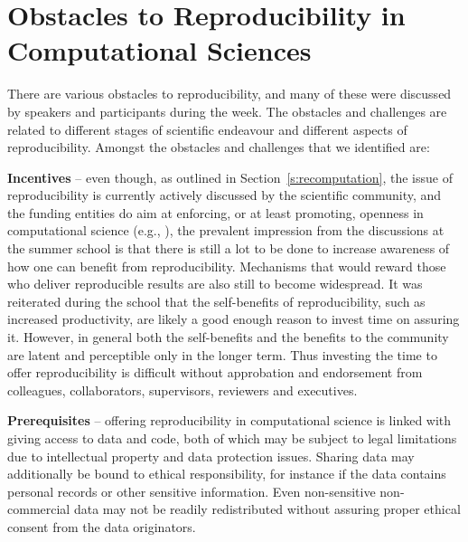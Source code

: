\section{Obstacles to Reproducibility in Computational Sciences}
\label{s:obstacles}

There are various obstacles to reproducibility, and many of these were
  discussed by speakers and participants during the week. 
The obstacles and challenges are related to different stages of scientific 
  endeavour and different aspects of reproducibility.
Amongst the obstacles and challenges that we identified are:

{\bf Incentives} -- even though, as outlined in Section~\ref{s:recomputation}, 
  the issue of reproducibility is
  currently actively discussed by the scientific community, 
  and the funding entities do aim at enforcing, or at least promoting,
  openness in computational science (e.g., \cite{NSF}), 
  the prevalent impression from the discussions at 
  the summer school is that there is still a lot to be done to increase 
  awareness of how one can benefit from reproducibility.
Mechanisms that would reward those who deliver reproducible results are also
  still to become widespread.
It was reiterated during the school that the self-benefits 
  of reproducibility, such as increased productivity, are likely 
  a good enough reason to invest time on assuring it.
However, in general both the self-benefits and the benefits to the community
  are latent and perceptible only in the longer term.
Thus investing the time to offer reproducibility is difficult without
  approbation and endorsement from colleagues, collaborators, supervisors,
  reviewers and executives.
  
{\bf Prerequisites} -- offering reproducibility in computational
  science is linked with giving access to data and code, both of which may
  be subject to legal limitations due to intellectual property and
  data protection issues.
Sharing data may additionally be bound to ethical responsibility, for instance
  if the data contains personal records or other sensitive information.  
Even non-sensitive non-commercial data may not be readily redistributed
  without assuring proper ethical consent from the data originators.

